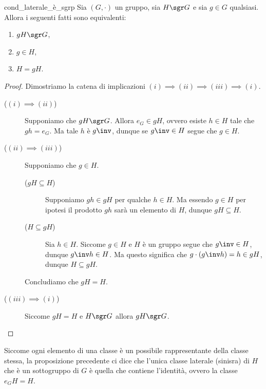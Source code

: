 \begin{proposition}{cond_laterale_è_sgrp}
    Sia $(G, \cdot)$ un gruppo, sia $H \sgr G$ e sia $g \in G$ qualsiasi. Allora i seguenti fatti sono equivalenti:
    \begin{enumerate}[label={(\roman*)}]
        \item $gH \sgr G$,
        \item $g \in H$,
        \item $H = gH$.
    \end{enumerate}
\end{proposition}
\begin{proof}
    Dimostriamo la catena di implicazioni $(i) \implies (ii) \implies (iii) \implies (i)$.
    \begin{description}
        \item[($(i) \implies (ii)$)] Supponiamo che $gH \sgr G$. Allora $e_G \in gH$, ovvero esiste $h \in H$ tale che $gh = e_G$. Ma tale $h$ è $g\inv$, dunque se $g\inv \in H$ segue che $g \in H$.
        \item[($(ii) \implies (iii)$)] Supponiamo che $g \in H$. 
        \begin{description}
            \item[($gH \subseteq H$)] Supponiamo $gh \in gH$ per qualche $h \in H$. Ma essendo $g \in H$ per ipotesi il prodotto $gh$ sarà un elemento di $H$, dunque $gH \subseteq H$.
            \item[($H \subseteq gH$)] Sia $h \in H$. Siccome $g \in H$ e $H$ è un gruppo segue che $g\inv \in H$, dunque $g\inv h \in H$. Ma questo significa che $g\cdot(g\inv h) = h \in gH$, dunque $H \subseteq gH$.
        \end{description}
        Concludiamo che $gH = H$.
        \item[($(iii) \implies (i)$)] Siccome $gH = H$ e $H \sgr G$ allora $gH \sgr G$. \qedhere 
    \end{description}
\end{proof}

Siccome ogni elemento di una classe è un possibile rappresentante della classe stessa, la proposizione precedente ci dice che l'unica classe laterale (sinisra) di $H$ che è un sottogruppo di $G$ è quella che contiene l'identità, ovvero la classe $e_GH = H$.

